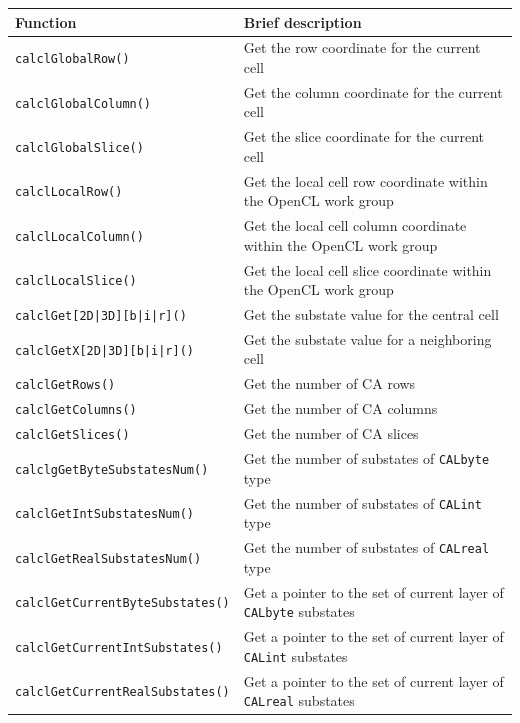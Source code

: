 \begin{table}
  \centering
  \begin{footnotesize}
  \begin{tabular}{l|l}
    \hline
    Function & Brief description\\
    \hline
    \verb'calclGlobalRow()'               & Get the row coordinate for the current cell \\
    \verb'calclGlobalColumn()'            & Get the column coordinate for the current cell \\
    \verb'calclGlobalSlice()'             & Get the slice coordinate for the current cell \\
    \verb'calclLocalRow() '               & Get the local cell row coordinate within the OpenCL work group\\
    \verb'calclLocalColumn()'             & Get the local cell column coordinate within the OpenCL work group\\
    \verb'calclLocalSlice()'              & Get the local cell slice coordinate within the OpenCL work group\\
    \verb'calclGet[2D|3D][b|i|r]()'       & Get the substate value for the central cell\\
    \verb'calclGetX[2D|3D][b|i|r]()'      & Get the substate value for a neighboring cell\\
    \verb'calclGetRows()'                 & Get the number of CA rows \\
    \verb'calclGetColumns()'              & Get the number of CA columns \\
    \verb'calclGetSlices()'               & Get the number of CA slices \\
    \verb'calclgGetByteSubstatesNum()'    & Get the number of substates of \verb'CALbyte' type \\
    \verb'calclGetIntSubstatesNum()'      & Get the number of substates of \verb'CALint' type \\
    \verb'calclGetRealSubstatesNum()'     & Get the number of substates of \verb'CALreal' type \\
    \verb'calclGetCurrentByteSubstates()' & Get a pointer to the set of current layer of \verb'CALbyte' substates \\
    \verb'calclGetCurrentIntSubstates()'  & Get a pointer to the set of current layer of \verb'CALint' substates \\
    \verb'calclGetCurrentRealSubstates()' & Get a pointer to the set of current layer of \verb'CALreal' substates \\

\end{tabular}
\end{footnotesize}
\end{table}
